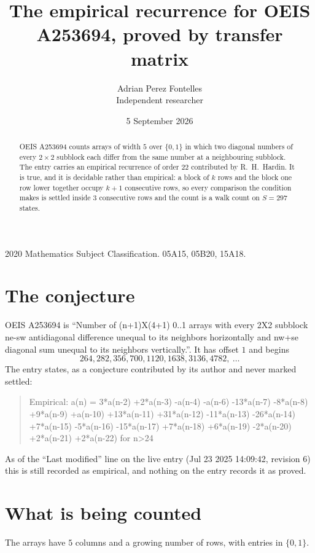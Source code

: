 \documentclass[11pt,a4paper]{article}
\title{The empirical recurrence for OEIS A253694, proved by transfer matrix}
\author{Adrian Perez Fontelles\\ \small Independent researcher}
\date{5 September 2026}
\theoremstyle{plain}
\theoremstyle{definition}
\begin{document}
\maketitle

\begin{abstract}
OEIS A253694 counts arrays of width $5$ over $\{0,1\}$ in which two diagonal numbers of every $2\times2$ subblock each differ from the same number at a neighbouring subblock. The entry carries an
empirical recurrence of order $22$ contributed by R.~H.~Hardin. It is true, and it is
decidable rather than empirical: a block of $k$ rows and the block one row lower together
occupy $k+1$ consecutive rows, so every comparison the condition makes is settled inside
$3$ consecutive rows and the count is a walk count on $S=297$ states.
\end{abstract}

\noindent\small 2020 Mathematics Subject Classification. 05A15, 05B20, 15A18.\normalsize

\section{The conjecture}

OEIS A253694 is ``Number of (n+1)X(4+1) 0..1 arrays with every 2X2 subblock ne-sw antidiagonal difference unequal to its neighbors horizontally and nw+se diagonal sum unequal to its neighbors vertically.''. It has offset $1$ and begins
\[
264, 282, 356, 700, 1120, 1638, 3136, 4782,\ \dots
\]
The entry states, as a conjecture contributed by its author and never marked settled:
\begin{quote}
Empirical: a(n) = 3*a(n-2) +2*a(n-3) -a(n-4) -a(n-6) -13*a(n-7) -8*a(n-8) +9*a(n-9) +a(n-10) +13*a(n-11) +31*a(n-12) -11*a(n-13) -26*a(n-14) +7*a(n-15) -5*a(n-16) -15*a(n-17) +7*a(n-18) +6*a(n-19) -2*a(n-20) +2*a(n-21) +2*a(n-22) for n>24
\end{quote}
As of the ``Last modified'' line on the live entry (Jul 23 2025 14:09:42, revision 6) this is still
recorded as empirical, and nothing on the entry records it as proved.

\section{What is being counted}

The arrays have $5$ columns and a growing number of rows, with entries in $\{0,1\}$.
\end{document}
